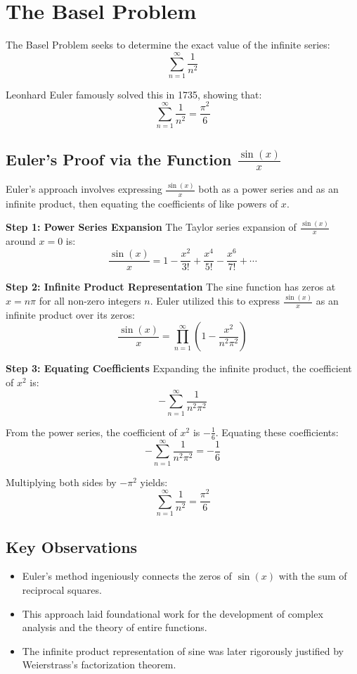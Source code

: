 \newpage
\section{The Basel Problem}

The Basel Problem seeks to determine the exact value of the infinite series:
\[
\sum_{n=1}^{\infty} \frac{1}{n^2}
\]

Leonhard Euler famously solved this in 1735, showing that:
\[
\sum_{n=1}^{\infty} \frac{1}{n^2} = \frac{\pi^2}{6}
\]

\subsection{Euler's Proof via the Function \( \frac{\sin(x)}{x} \)}

Euler's approach involves expressing \( \frac{\sin(x)}{x} \) both as a power series and as an infinite product, then equating the coefficients of like powers of \( x \).

\textbf{Step 1: Power Series Expansion}
\newline
The Taylor series expansion of \( \frac{\sin(x)}{x} \) around \( x = 0 \) is:
\[
\frac{\sin(x)}{x} = 1 - \frac{x^2}{3!} + \frac{x^4}{5!} - \frac{x^6}{7!} + \cdots
\]

\textbf{Step 2: Infinite Product Representation}
\newline
The sine function has zeros at \( x = n\pi \) for all non-zero integers \( n \). Euler utilized this to express \( \frac{\sin(x)}{x} \) as an infinite product over its zeros:
\[
\frac{\sin(x)}{x} = \prod_{n=1}^{\infty} \left(1 - \frac{x^2}{n^2\pi^2}\right)
\]

\textbf{Step 3: Equating Coefficients}
\newline
Expanding the infinite product, the coefficient of \( x^2 \) is:
\[
-\sum_{n=1}^{\infty} \frac{1}{n^2\pi^2}
\]

From the power series, the coefficient of \( x^2 \) is \( -\frac{1}{6} \). Equating these coefficients:
\[
-\sum_{n=1}^{\infty} \frac{1}{n^2\pi^2} = -\frac{1}{6}
\]

Multiplying both sides by \( -\pi^2 \) yields:
\[
\sum_{n=1}^{\infty} \frac{1}{n^2} = \frac{\pi^2}{6}
\]

\subsection{Key Observations}

\begin{itemize}[label=\(-\)]
    \item Euler's method ingeniously connects the zeros of \( \sin(x) \) with the sum of reciprocal squares.
    \item This approach laid foundational work for the development of complex analysis and the theory of entire functions.
    \item The infinite product representation of sine was later rigorously justified by Weierstrass's factorization theorem.
\end{itemize}
